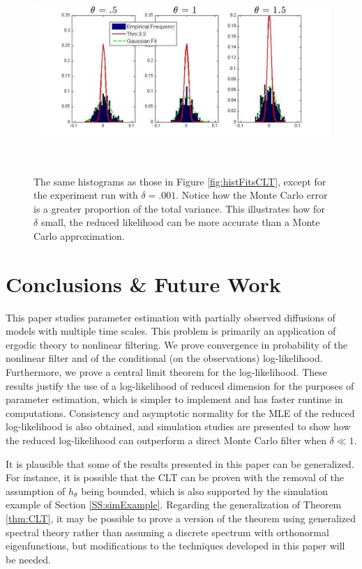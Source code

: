 \documentclass{article}
\begin{document}
\begin{figure}[htbp] %
   \centering
   \includegraphics[height=3in,width=6.5in]{histFitsCLTlowDelta}
  \caption{The same histograms as those in Figure \ref{fig:histFitsCLT}, except for the experiment run with $\delta=.001$. Notice how the Monte Carlo error is a greater proportion of the total variance. This illustrates how for $\delta $ small, the reduced likelihood can be more accurate than a Monte Carlo approximation.}
   \label{fig:histFitsCLTlowDelta}
\end{figure}


\section{Conclusions \& Future Work}\label{S:Conclusions}
This paper studies parameter estimation with partially observed diffusions of models with multiple time scales. This problem is primarily an application of ergodic theory to nonlinear filtering. We prove convergence in probability of the nonlinear filter and of the conditional (on the observations) log-likelihood. Furthermore, we prove a central limit theorem for the log-likelihood. These results justify the use of a log-likelihood of reduced dimension for the purposes of parameter estimation, which is simpler to implement and has faster runtime in computations. Consistency and asymptotic normality for the MLE of the reduced log-likelihood is also obtained, and simulation studies are presented to show how the reduced log-likelihood can outperform a direct Monte Carlo filter when $\delta \ll1$.

It is plausible that some of the results presented in this paper can be generalized. For instance, it is possible that the CLT can be proven with the removal of the assumption of $h_\theta$ being bounded, which is also supported by the simulation example of Section \ref{SS:simExample}. Regarding the generalization of Theorem \ref{thm:CLT}, it may be possible to prove a version of the theorem using generalized spectral theory rather than assuming a discrete spectrum with orthonormal eigenfunctions, but modifications to the techniques developed in this paper will be needed.
\end{document}
